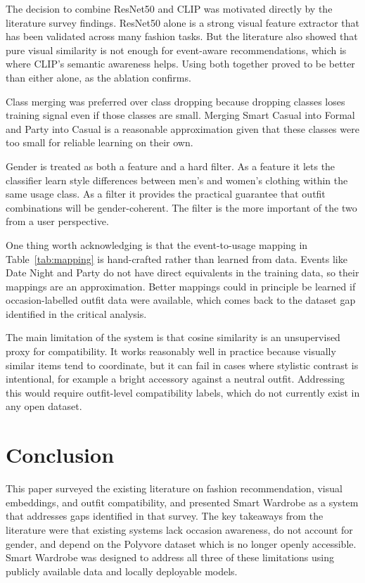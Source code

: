 \documentclass[conference]{IEEEtran}
\begin{document}
The decision to combine ResNet50 and CLIP was motivated directly by the literature survey findings. ResNet50 alone is a strong visual feature extractor that has been validated across many fashion tasks. But the literature also showed that pure visual similarity is not enough for event-aware recommendations, which is where CLIP's semantic awareness helps. Using both together proved to be better than either alone, as the ablation confirms.

Class merging was preferred over class dropping because dropping classes loses training signal even if those classes are small. Merging Smart Casual into Formal and Party into Casual is a reasonable approximation given that these classes were too small for reliable learning on their own.

Gender is treated as both a feature and a hard filter. As a feature it lets the classifier learn style differences between men's and women's clothing within the same usage class. As a filter it provides the practical guarantee that outfit combinations will be gender-coherent. The filter is the more important of the two from a user perspective.

One thing worth acknowledging is that the event-to-usage mapping in Table~\ref{tab:mapping} is hand-crafted rather than learned from data. Events like Date Night and Party do not have direct equivalents in the training data, so their mappings are an approximation. Better mappings could in principle be learned if occasion-labelled outfit data were available, which comes back to the dataset gap identified in the critical analysis.

The main limitation of the system is that cosine similarity is an unsupervised proxy for compatibility. It works reasonably well in practice because visually similar items tend to coordinate, but it can fail in cases where stylistic contrast is intentional, for example a bright accessory against a neutral outfit. Addressing this would require outfit-level compatibility labels, which do not currently exist in any open dataset.

\section{Conclusion}

This paper surveyed the existing literature on fashion recommendation, visual embeddings, and outfit compatibility, and presented Smart Wardrobe as a system that addresses gaps identified in that survey. The key takeaways from the literature were that existing systems lack occasion awareness, do not account for gender, and depend on the Polyvore dataset which is no longer openly accessible. Smart Wardrobe was designed to address all three of these limitations using publicly available data and locally deployable models.
\end{document}

